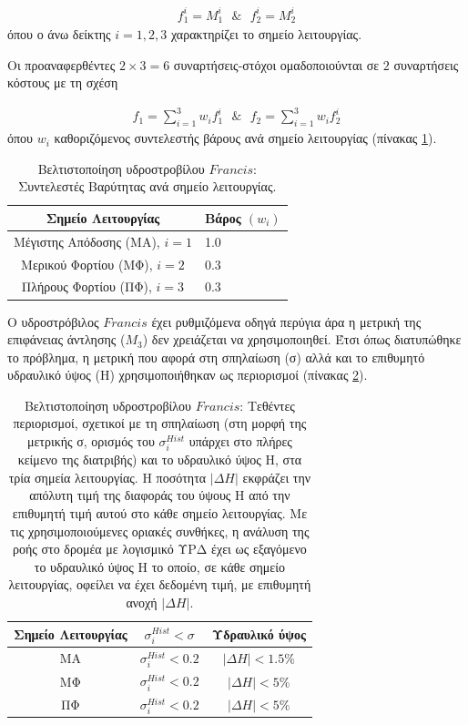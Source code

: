 \begin{eqnarray}
   f_1^i=M_1^i ~~~\&~~~ f_2^i=M_2^i 
   \label{ObjFrancis} 
\end{eqnarray}
όπου ο άνω δείκτης $i=1,2,3$ χαρακτηρίζει το σημείο λειτουργίας.

Οι προαναφερθέντες $2\times3=6$ συναρτήσεις-στόχοι ομαδοποιούνται σε $2$ συναρτήσεις κόστους με τη σχέση    

\begin{eqnarray}
   f_1=\sum^3_{i=1}w_if_1^i ~~~\&~~~ f_2=\sum^3_{i=1}w_if_2^i 
   \label{ObjFrancis2} 
\end{eqnarray}
όπου $w_i$ καθοριζόμενος συντελεστής βάρους ανά σημείο λειτουργίας (πίνακας \ref{op-weights}).

\begin{table}[h!]
\begin{center}
\begin{tabular}{ |c|l| }
\hline
Σημείο Λειτουργίας & Βάρος $(w_i)$\\
\hline
Μέγιστης Απόδοσης (ΜΑ), $i=1$ & 1.0\\
\hline
Μερικού Φορτίου  (ΜΦ), $i=2$ & 0.3\\
\hline
Πλήρους Φορτίου (ΠΦ), $i=3$ & 0.3\\
\hline
\end{tabular}
\caption{Βελτιστοποίηση υδροστροβίλου $Francis$: Συντελεστές Βαρύτητας ανά σημείο λειτουργίας.}
\label{op-weights}
\end{center}
\end{table}

 Ο υδροστρόβιλος $Francis$ έχει ρυθμιζόμενα οδηγά περύγια άρα η μετρική της επιφάνειας άντλησης ($Μ_3$) δεν χρειάζεται να χρησιμοποιηθεί. Έτσι όπως διατυπώθηκε το πρόβλημα, η μετρική που αφορά στη σπηλαίωση (σ) αλλά και το επιθυμητό υδραυλικό ύψος (Η) χρησιμοποιήθηκαν ως περιορισμοί (πίνακας \ref{Cons}).


\begin{table}[h!]
\begin{center}
\begin{tabular}{ |c|c|c| }
\hline
Σημείο Λειτουργίας  & $\sigma_i^{Hist}<\sigma$ & Υδραυλικό ύψος\\
\hline
ΜΑ & $\sigma_i^{Hist}<0.2$ & $|\Delta H|<1.5\%$\\
\hline
ΜΦ       & $\sigma_i^{Hist}<0.2$ & $|\Delta H|<5\%$\\
\hline
ΠΦ       & $\sigma_i^{Hist}<0.2$ & $|\Delta H|<5\%$\\
\hline
\end{tabular}
\caption{Βελτιστοποίηση υδροστροβίλου $Francis$: Τεθέντες περιορισμοί, σχετικοί με τη σπηλαίωση (στη μορφή της μετρικής σ, ορισμός του $\sigma_i^{Hist}$ υπάρχει στο πλήρες κείμενο της διατριβής) και το υδραυλικό ύψος Η, στα τρία σημεία λειτουργίας. Η ποσότητα $|\Delta H|$ εκφράζει την απόλυτη τιμή της διαφοράς του ύψους Η από την επιθυμητή τιμή αυτού στο κάθε σημείο λειτουργίας. Με τις χρησιμοποιούμενες οριακές συνθήκες, η ανάλυση της ροής στο δρομέα με λογισμικό ΥΡΔ έχει ως εξαγόμενο το υδραυλικό ύψος Η το οποίο, σε κάθε σημείο λειτουργίας, οφείλει να έχει δεδομένη τιμή, με επιθυμητή ανοχή $|\Delta H|$.}
\label{Cons}
\end{center}
\end{table}


